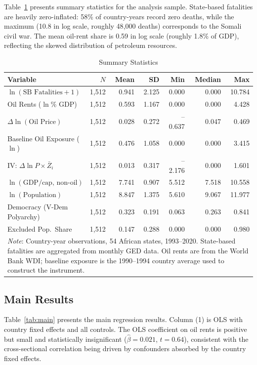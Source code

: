 \documentclass[12pt]{article}
\begin{document}
Table~\ref{tab:summary} presents summary statistics for the analysis sample.
State-based fatalities are heavily zero-inflated:
58\% of country-years record zero deaths,
while the maximum (10.8 in log scale, roughly 48{,}000 deaths) corresponds
to the Somali civil war.
The mean oil-rent share is 0.59 in log scale (roughly 1.8\% of GDP),
reflecting the skewed distribution of petroleum resources.

\begin{table}[htbp]
\centering\small
\caption{Summary Statistics}
\label{tab:summary}
\begin{tabular}{lrrrrrr}
\toprule
Variable & $N$ & Mean & SD & Min & Median & Max \\
\midrule
$\ln(\text{SB Fatalities}+1)$      & 1,512 & 0.941 & 2.125 & 0.000 & 0.000 & 10.784 \\
Oil Rents ($\ln$\% GDP)            & 1,512 & 0.593 & 1.167 & 0.000 & 0.000 &  4.428 \\
$\Delta\ln(\text{Oil Price})$      & 1,512 & 0.028 & 0.272 & --0.637& 0.047 & 0.469 \\
Baseline Oil Exposure ($\ln$)      & 1,512 & 0.476 & 1.058 & 0.000 & 0.000 &  3.415 \\
IV: $\Delta\ln P \times \bar{Z}_i$ & 1,512 & 0.013 & 0.317 & --2.176& 0.000 & 1.601 \\
$\ln(\text{GDP/cap, non-oil})$     & 1,512 & 7.741 & 0.907 & 5.512 & 7.518 & 10.558 \\
$\ln(\text{Population})$           & 1,512 & 8.847 & 1.375 & 5.610 & 9.067 & 11.977 \\
Democracy (V-Dem Polyarchy)        & 1,512 & 0.323 & 0.191 & 0.063 & 0.263 &  0.841 \\
Excluded Pop.\ Share               & 1,512 & 0.147 & 0.288 & 0.000 & 0.000 &  0.980 \\
\bottomrule
\multicolumn{7}{p{0.9\linewidth}}{\footnotesize
\textit{Note}: Country-year observations, 54 African states, 1993--2020.
State-based fatalities are aggregated from monthly GED data.
Oil rents are from the World Bank WDI; baseline exposure is the 1990--1994
country average used to construct the instrument.}
\end{tabular}
\end{table}

\subsection{Main Results}

Table~\ref{tab:main} presents the main regression results.
Column (1) is OLS with country fixed effects and all controls.
The OLS coefficient on oil rents is positive but small
and statistically insignificant ($\hat{\beta} = 0.021$, $t = 0.64$),
consistent with the cross-sectional correlation being driven by
confounders absorbed by the country fixed effects.
\end{document}
